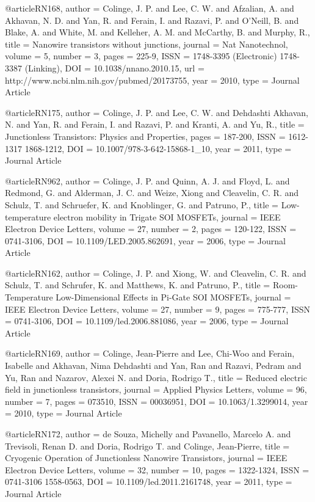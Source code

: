 @article{RN168,
   author = {Colinge, J. P. and Lee, C. W. and Afzalian, A. and Akhavan, N. D. and Yan, R. and Ferain, I. and Razavi, P. and O'Neill, B. and Blake, A. and White, M. and Kelleher, A. M. and McCarthy, B. and Murphy, R.},
   title = {Nanowire transistors without junctions},
   journal = {Nat Nanotechnol},
   volume = {5},
   number = {3},
   pages = {225-9},
   ISSN = {1748-3395 (Electronic)
1748-3387 (Linking)},
   DOI = {10.1038/nnano.2010.15},
   url = {http://www.ncbi.nlm.nih.gov/pubmed/20173755},
   year = {2010},
   type = {Journal Article}
}

@article{RN175,
   author = {Colinge, J. P. and Lee, C. W. and Dehdashti Akhavan, N. and Yan, R. and Ferain, I. and Razavi, P. and Kranti, A. and Yu, R.},
   title = {Junctionless Transistors: Physics and Properties},
   pages = {187-200},
   ISSN = {1612-1317
1868-1212},
   DOI = {10.1007/978-3-642-15868-1_10},
   year = {2011},
   type = {Journal Article}
}

@article{RN962,
   author = {Colinge, J. P. and Quinn, A. J. and Floyd, L. and Redmond, G. and Alderman, J. C. and Weize, Xiong and Cleavelin, C. R. and Schulz, T. and Schruefer, K. and Knoblinger, G. and Patruno, P.},
   title = {Low-temperature electron mobility in Trigate SOI MOSFETs},
   journal = {IEEE Electron Device Letters},
   volume = {27},
   number = {2},
   pages = {120-122},
   ISSN = {0741-3106},
   DOI = {10.1109/LED.2005.862691},
   year = {2006},
   type = {Journal Article}
}

@article{RN162,
   author = {Colinge, J. P. and Xiong, W. and Cleavelin, C. R. and Schulz, T. and Schrufer, K. and Matthews, K. and Patruno, P.},
   title = {Room-Temperature Low-Dimensional Effects in Pi-Gate SOI MOSFETs},
   journal = {IEEE Electron Device Letters},
   volume = {27},
   number = {9},
   pages = {775-777},
   ISSN = {0741-3106},
   DOI = {10.1109/led.2006.881086},
   year = {2006},
   type = {Journal Article}
}

@article{RN169,
   author = {Colinge, Jean-Pierre and Lee, Chi-Woo and Ferain, Isabelle and Akhavan, Nima Dehdashti and Yan, Ran and Razavi, Pedram and Yu, Ran and Nazarov, Alexei N. and Doria, Rodrigo T.},
   title = {Reduced electric field in junctionless transistors},
   journal = {Applied Physics Letters},
   volume = {96},
   number = {7},
   pages = {073510},
   ISSN = {00036951},
   DOI = {10.1063/1.3299014},
   year = {2010},
   type = {Journal Article}
}

@article{RN172,
   author = {de Souza, Michelly and Pavanello, Marcelo A. and Trevisoli, Renan D. and Doria, Rodrigo T. and Colinge, Jean-Pierre},
   title = {Cryogenic Operation of Junctionless Nanowire Transistors},
   journal = {IEEE Electron Device Letters},
   volume = {32},
   number = {10},
   pages = {1322-1324},
   ISSN = {0741-3106
1558-0563},
   DOI = {10.1109/led.2011.2161748},
   year = {2011},
   type = {Journal Article}
}

